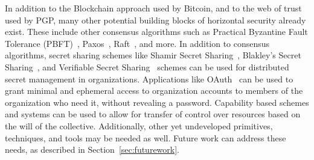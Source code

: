 In addition to the Blockchain approach used by Bitcoin, and to the web of trust
used by PGP, many other potential building blocks of horizontal security already
exist. These include other consensus algorithms such as Practical Byzantine
Fault Tolerance (PBFT)~\cite{castro1999practical}, Paxos~\cite{lamport2019part}, 
Raft~\cite{ongaro2013search}, and more. In addition to consensus algorithms,
secret sharing schemes like Shamir Secret Sharing~\cite{shamir1979share}, 
Blakley's Secret Sharing~\cite{blakley1993linear}, and Verifiable Secret 
Sharing~\cite{chor1985verifiable} schemes can be used for distributed secret
management in organizations. Applications like OAuth~\cite{leiba2012oauth} can
be used to grant minimal and ephemeral access to organization accounts to
members of the organization who need it, without revealing a password. 
Capability based schemes and systems can be used to allow for transfer of
control over resources based on the will of the collective. Additionally, other
yet undeveloped primitives, techniques, and tools may be needed as well. Future
work can address these needs, as described in Section~\ref{sec:futurework}.







